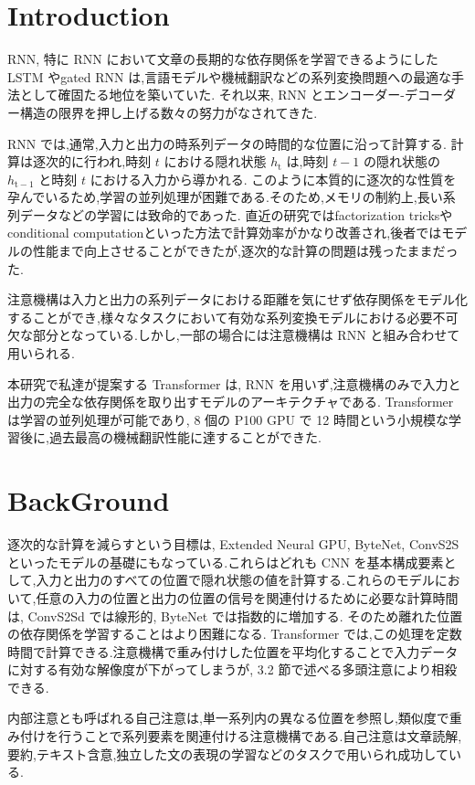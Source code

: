 \documentclass{jarticle}     %
\begin{document}
\section{Introduction}
RNN, 特に RNN において文章の長期的な依存関係を学習できるようにした LSTM\cite{LSTM} やgated RNN \cite{GRU} は,言語モデルや機械翻訳などの系列変換問題への最適な手法として確固たる地位を築いていた.
それ以来, RNN とエンコーダー-デコーダー構造の限界を押し上げる数々の努力がなされてきた.
\par
RNN では,通常,入力と出力の時系列データの時間的な位置に沿って計算する.
計算は逐次的に行われ,時刻 $t$ における隠れ状態 $h_\mathrm{t}$ は,時刻 $t-1$ の隠れ状態の $h_\mathrm{t-1}$ と時刻 $t$ における入力から導かれる.
このように本質的に逐次的な性質を孕んでいるため,学習の並列処理が困難である.そのため,メモリの制約上,長い系列データなどの学習には致命的であった.
直近の研究ではfactorization tricksやconditional computationといった方法で計算効率がかなり改善され,後者ではモデルの性能まで向上させることができたが,逐次的な計算の問題は残ったままだった.\par
注意機構は入力と出力の系列データにおける距離を気にせず依存関係をモデル化することができ,様々なタスクにおいて有効な系列変換モデルにおける必要不可欠な部分となっている.しかし,一部の場合には注意機構は RNN と組み合わせて用いられる.\par
本研究で私達が提案する Transformer は, RNN を用いず,注意機構のみで入力と出力の完全な依存関係を取り出すモデルのアーキテクチャである.
 Transformer は学習の並列処理が可能であり, 8 個の P100 GPU で 12 時間という小規模な学習後に,過去最高の機械翻訳性能に達することができた.


\section{BackGround}
逐次的な計算を減らすという目標は, Extended Neural GPU, ByteNet, ConvS2S といったモデルの基礎にもなっている.これらはどれも CNN を基本構成要素として,入力と出力のすべての位置で隠れ状態の値を計算する.これらのモデルにおいて,任意の入力の位置と出力の位置の信号を関連付けるために必要な計算時間は, ConvS2Sd では線形的, ByteNet では指数的に増加する.
そのため離れた位置の依存関係を学習することはより困難になる.
 Transformer では,この処理を定数時間で計算できる.注意機構で重み付けした位置を平均化することで入力データに対する有効な解像度が下がってしまうが, 3.2 節で述べる多頭注意により相殺できる.\par

内部注意とも呼ばれる自己注意は,単一系列内の異なる位置を参照し,類似度で重み付けを行うことで系列要素を関連付ける注意機構である.自己注意は文章読解,要約,テキスト含意,独立した文の表現の学習などのタスクで用いられ成功している.\par
\end{document}
